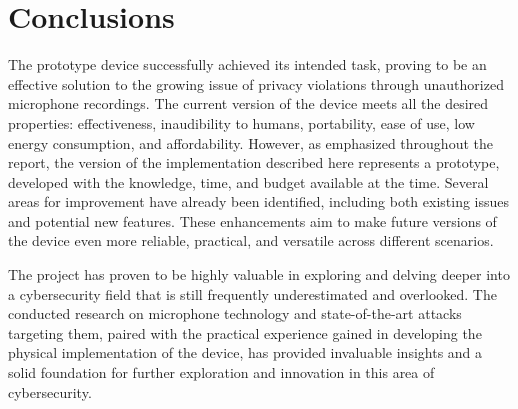 \chapter{Conclusions}
The prototype device successfully achieved its intended task, proving to be an effective solution to the growing issue of privacy violations through unauthorized microphone recordings.
The current version of the device meets all the desired properties: effectiveness, inaudibility to humans, portability, ease of use, low energy consumption, and affordability.
However, as emphasized throughout the report, the version of the implementation described here represents a prototype, developed with the knowledge, time, and budget available at the time.
Several areas for improvement have already been identified, including both existing issues and potential new features. 
These enhancements aim to make future versions of the device even more reliable, practical, and versatile across different scenarios.

The project has proven to be highly valuable in exploring and delving deeper into a cybersecurity field that is still frequently underestimated and overlooked.
The conducted research on microphone technology and state-of-the-art attacks targeting them, paired with the practical experience gained in developing the physical implementation of the device, has provided invaluable insights and a solid foundation for further exploration and innovation in this area of cybersecurity.